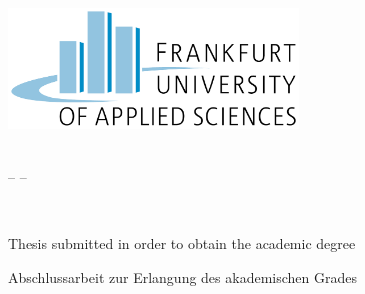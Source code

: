 \thispagestyle{empty}

\begin{titlepage}
	
	\vspace*{-2,5cm}
  	\begin{center}
    		\includegraphics[width=7.7cm]{Figures/pdf/FraUas_Logo.pdf} \\ 
  	\end{center}

  	\begin{center}
		\vspace{0.1cm}
		\LARGE \textbf{\University}\\
		\vspace{0.4cm}
		\Large -- \Faculty --
	\end{center}
	
	\vfill
	
	\begin{center}
		\huge \textbf{\ThesisTitle}\\
		\vspace{0.4cm}
		\LARGE \ThesisSubtitle
	\end{center}
	
	\vfill
	
	\ifdefined\ThesisLanguageIsEnglish
		\begin{center}
			\Large Thesis submitted in order to obtain the academic degree\\
			\vspace{0.3cm}
			\Large \ThesisDegree
		\end{center}
	\else
		\begin{center}
			\Large Abschlussarbeit zur Erlangung des akademischen Grades\\
			\vspace{0.3cm}
			\Large \ThesisDegree   %
		\end{center}
	\fi
	

\end{titlepage}
